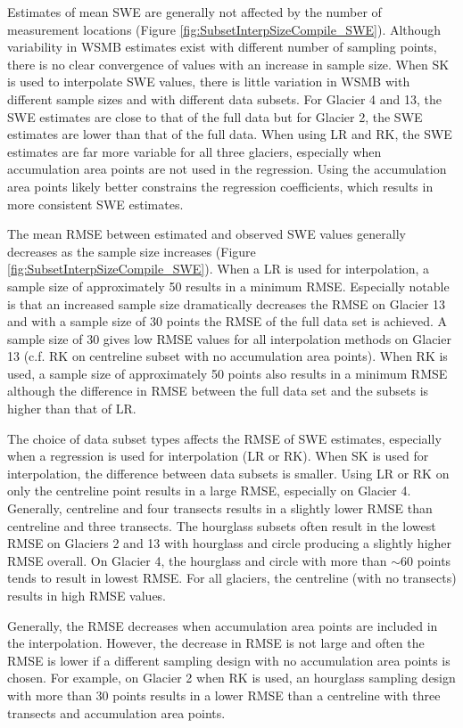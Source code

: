 \documentclass[12pt]{article}
\begin{document}
Estimates of mean SWE are generally not affected by the number of measurement locations (Figure \ref{fig:SubsetInterpSizeCompile_SWE}). Although variability in WSMB estimates exist with different number of sampling points, there is no clear convergence of values with an increase in sample size. When SK is used to interpolate SWE values, there is little variation in WSMB with different sample sizes and with different data subsets. For Glacier 4 and 13, the SWE estimates are close to that of the full data but for Glacier 2, the SWE estimates are lower than that of the full data. When using LR and RK, the SWE estimates are far more variable for all three glaciers, especially when accumulation area points are not used in the regression. Using the accumulation area points likely better constrains the regression coefficients, which results in more consistent SWE estimates. 

The mean RMSE between estimated and observed SWE values generally decreases as the sample size increases (Figure \ref{fig:SubsetInterpSizeCompile_SWE}). When a LR is used for interpolation, a sample size of approximately 50 results in a minimum RMSE. Especially notable is that an increased sample size dramatically decreases the RMSE on Glacier 13 and with a sample size of 30 points the RMSE of the full data set is achieved. A sample size of 30 gives low RMSE values for all interpolation methods on Glacier 13 (c.f. RK on centreline subset with no accumulation area points).  When RK is used, a sample size of approximately 50 points also results in a minimum RMSE although the difference in RMSE between the full data set and the subsets is higher than that of LR. 

The choice of data subset types affects the RMSE of SWE estimates, especially when a regression is used for interpolation (LR or RK). When SK is used for interpolation, the difference between data subsets is smaller. Using LR or RK on only the centreline point results in a large RMSE, especially on Glacier 4. Generally, centreline and four transects results in a slightly lower RMSE than centreline and three transects. The hourglass subsets often result in the lowest RMSE on Glaciers 2 and 13 with hourglass and circle producing a slightly higher RMSE overall. On Glacier 4, the hourglass and circle with more than $\sim$60 points tends to result in lowest RMSE. For all glaciers, the centreline (with no transects) results in high RMSE values.

Generally, the RMSE decreases when accumulation area points are included in the interpolation. However, the decrease in RMSE is not large and often the RMSE is lower if a different sampling design with no accumulation area points is chosen. For example, on Glacier 2 when RK is used, an hourglass sampling design with more than 30 points results in a lower RMSE than a centreline with three transects and accumulation area points. 
\end{document}
